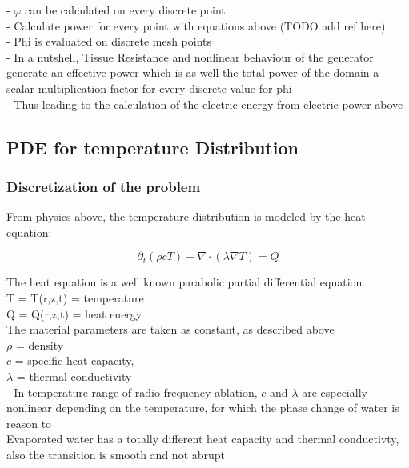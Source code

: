 \documentclass[parskip=half, titlepage=yes, 12pt, BCOR=12mm, DIV=calc]{scrartcl}
\begin{document}
- $\varphi$ can be calculated on every discrete point \\
- Calculate power for every point with equations above (TODO add ref here) \\
- Phi is evaluated on discrete mesh points \\
- In a nutshell, Tissue Resistance and nonlinear behaviour of the generator generate an effective power which is as well the total power of the domain  a scalar multiplication factor for every discrete value for phi \\

- Thus leading to the calculation of the electric energy from electric power above \\


\subsection{PDE for temperature Distribution}

\subsubsection{Discretization of the problem}

From physics above, the temperature distribution is modeled by the heat equation: 

\begin{equation}
    \partial_t (\rho c T) - \nabla \cdot (\lambda \nabla T) = Q
\end{equation}

The heat equation is a well known parabolic partial differential equation. \\

T = T(r,z,t) = temperature \\
Q = Q(r,z,t) = heat energy \\

The material parameters are taken as constant, as described above \\
$\rho$ = density \\
$c$ = specific heat capacity, \\
$\lambda$ = thermal conductivity \\
- In temperature range of radio frequency ablation, $c$ and $\lambda$ are especially nonlinear depending on the temperature, for which the phase change of water is reason to \\ Evaporated water has a totally different heat capacity and thermal conductivty, also the transition is smooth and not abrupt \\
\end{document}

